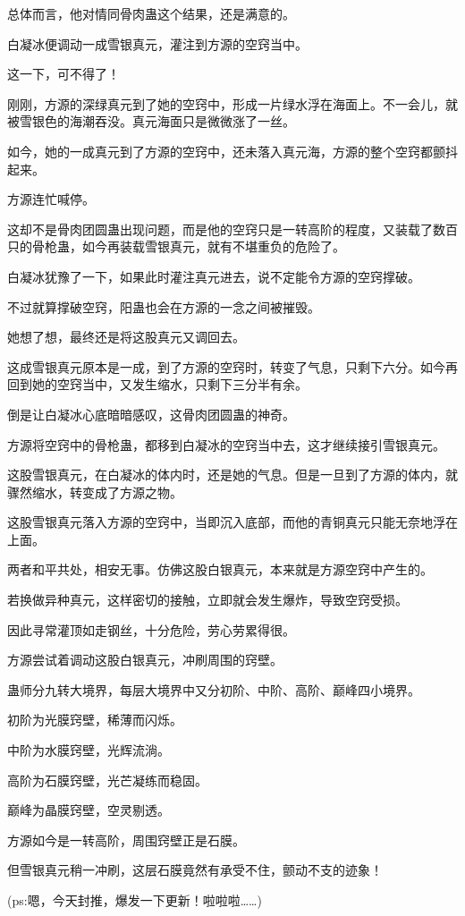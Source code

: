 \begin{this_body}
总体而言，他对情同骨肉蛊这个结果，还是满意的。

白凝冰便调动一成雪银真元，灌注到方源的空窍当中。

这一下，可不得了！

刚刚，方源的深绿真元到了她的空窍中，形成一片绿水浮在海面上。不一会儿，就被雪银色的海潮吞没。真元海面只是微微涨了一丝。

如今，她的一成真元到了方源的空窍中，还未落入真元海，方源的整个空窍都颤抖起来。

方源连忙喊停。

这却不是骨肉团圆蛊出现问题，而是他的空窍只是一转高阶的程度，又装载了数百只的骨枪蛊，如今再装载雪银真元，就有不堪重负的危险了。

白凝冰犹豫了一下，如果此时灌注真元进去，说不定能令方源的空窍撑破。

不过就算撑破空窍，阳蛊也会在方源的一念之间被摧毁。

她想了想，最终还是将这股真元又调回去。

这成雪银真元原本是一成，到了方源的空窍时，转变了气息，只剩下六分。如今再回到她的空窍当中，又发生缩水，只剩下三分半有余。

倒是让白凝冰心底暗暗感叹，这骨肉团圆蛊的神奇。

方源将空窍中的骨枪蛊，都移到白凝冰的空窍当中去，这才继续接引雪银真元。

这股雪银真元，在白凝冰的体内时，还是她的气息。但是一旦到了方源的体内，就骤然缩水，转变成了方源之物。

这股雪银真元落入方源的空窍中，当即沉入底部，而他的青铜真元只能无奈地浮在上面。

两者和平共处，相安无事。仿佛这股白银真元，本来就是方源空窍中产生的。

若换做异种真元，这样密切的接触，立即就会发生爆炸，导致空窍受损。

因此寻常灌顶如走钢丝，十分危险，劳心劳累得很。

方源尝试着调动这股白银真元，冲刷周围的窍壁。

蛊师分九转大境界，每层大境界中又分初阶、中阶、高阶、巅峰四小境界。

初阶为光膜窍壁，稀薄而闪烁。

中阶为水膜窍壁，光辉流淌。

高阶为石膜窍壁，光芒凝练而稳固。

巅峰为晶膜窍壁，空灵剔透。

方源如今是一转高阶，周围窍壁正是石膜。

但雪银真元稍一冲刷，这层石膜竟然有承受不住，颤动不支的迹象！

(ps:嗯，今天封推，爆发一下更新！啦啦啦……)

\end{this_body}

